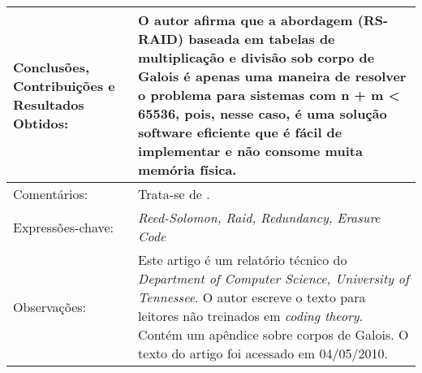 \documentclass[10pt,a4paper]{article}
\begin{document}
\begin{center}
\begin{tabular}{|p{5cm}||p{10cm}|}
Conclusões, Contribuições e Resultados Obtidos: &  O autor afirma que a abordagem (RS-RAID) baseada em tabelas de multiplicação e divisão sob corpo de Galois é apenas uma maneira de resolver o problema para sistemas com n + m < 65536, pois, nesse caso, é uma solução software eficiente que é fácil de implementar e não consome muita memória física. \\\hline
Comentários: & Trata-se de . \\\hline
Expressões-chave: & \emph{Reed-Solomon, Raid, Redundancy, Erasure Code}\\\hline
Observações: &  Este artigo é um relatório técnico do \emph{Department of Computer Science, University of Tennessee}. O autor escreve o texto para leitores não treinados em \emph{coding theory}. Contém um apêndice sobre corpos de Galois. O texto do artigo foi acessado em 04/05/2010.\\\hline

\end{tabular}
\end{center}
\end{document}
